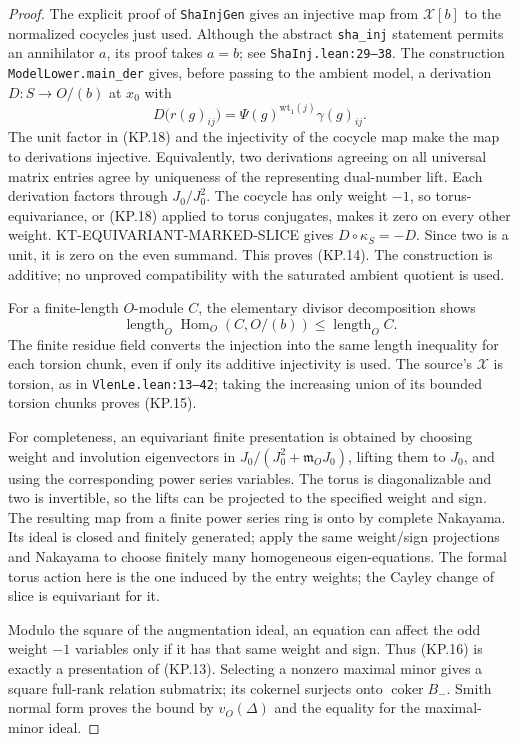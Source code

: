 \begin{proof}
The explicit proof of \texttt{ShaInjGen} gives an injective
map from $\mathcal X[b]$ to the normalized cocycles just used.
Although the abstract \texttt{sha\_inj} statement permits an
annihilator $a$, its proof takes $a=b$; see
\texttt{ShaInj.lean:29--38}.  The construction
\texttt{ModelLower.main\_der} gives, before passing to the
ambient model, a derivation
$D:S\to O/(b)$ at $x_0$ with
\[
 D\bigl(r(g)_{ij}\bigr)=\Psi(g)^{\mathrm{wt}_1(j)}\gamma(g)_{ij}.
                                                                  \tag{KP.18}
\]
The unit factor in (KP.18) and the injectivity of the cocycle
map make the map to derivations injective.  Equivalently, two
derivations agreeing on all universal matrix entries agree
by uniqueness of the representing dual-number lift.  Each
derivation factors through $J_0/J_0^2$.  The cocycle has only
weight $-1$, so torus-equivariance, or (KP.18) applied to
torus conjugates, makes it zero on every other weight.
KT-EQUIVARIANT-MARKED-SLICE gives $D\circ\kappa_S=-D$.
Since two is a unit, it is zero on the even summand.  This
proves (KP.14).  The construction is additive; no unproved
compatibility with the saturated ambient quotient is used.

For a finite-length $O$-module $C$, the elementary divisor
decomposition shows
\[
\operatorname{length}_O\operatorname{Hom}_O(C,O/(b))
\leq\operatorname{length}_O C.
\]
The finite residue field
converts the injection into the same length inequality for
each torsion chunk, even if only its additive injectivity is
used.  The source's $\mathcal X$ is torsion, as in
\texttt{VlenLe.lean:13--42}; taking the increasing union of
its bounded torsion chunks proves (KP.15).

For completeness, an equivariant finite presentation is
obtained by choosing weight and involution eigenvectors in
$J_0/(J_0^2+\mathfrak m_OJ_0)$, lifting them to $J_0$, and
using the corresponding power series variables.  The torus
is diagonalizable and two is invertible, so the lifts can be
projected to the specified weight and sign.  The resulting
map from a finite power series ring is onto by complete
Nakayama.  Its ideal is closed and finitely generated;
apply the same weight/sign projections and Nakayama to
choose finitely many homogeneous eigen-equations.  The
formal torus action here is the one induced by the entry
weights; the Cayley change of slice is equivariant for it.

Modulo the square of the augmentation ideal, an equation
can affect the odd weight $-1$ variables only if it has that
same weight and sign.  Thus (KP.16) is exactly a presentation
of (KP.13).  Selecting a nonzero maximal minor gives a
square full-rank relation submatrix; its cokernel surjects
onto $\operatorname{coker}B_-$.  Smith normal form proves
the bound by $v_O(\Delta)$ and the equality for the
maximal-minor ideal.
\end{proof}

